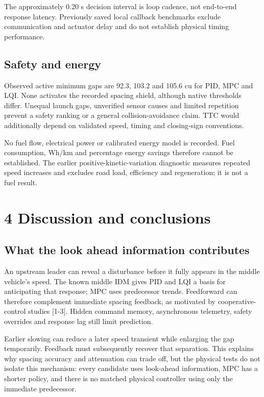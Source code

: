 \documentclass[11pt,a4paper]{article}
\begin{document}
The approximately 0.20 s decision interval is loop cadence, not end-to-end response latency. Previously saved local callback benchmarks exclude communication and actuator delay and do not establish physical timing performance.


\subsection*{Safety and energy}

Observed active minimum gaps are 92.3, 103.2 and 105.6 cu for PID, MPC and LQI. None activates the recorded spacing shield, although native thresholds differ. Unequal launch gaps, unverified sensor causes and limited repetition prevent a safety ranking or a general collision-avoidance claim. TTC would additionally depend on validated speed, timing and closing-sign conventions.


No fuel flow, electrical power or calibrated energy model is recorded. Fuel consumption, Wh/km and percentage energy savings therefore cannot be established. The earlier positive-kinetic-variation diagnostic measures repeated speed increases and excludes road load, efficiency and regeneration; it is not a fuel result.


\newpage

\section*{4 Discussion and conclusions}

\subsection*{What the look ahead information contributes}

An upstream leader can reveal a disturbance before it fully appears in the middle vehicle's speed. The known middle IDM gives PID and LQI a basis for anticipating that response; MPC uses predecessor trends. Feedforward can therefore complement immediate spacing feedback, as motivated by cooperative-control studies [1-3]. Hidden command memory, asynchronous telemetry, safety overrides and response lag still limit prediction.


Earlier slowing can reduce a later speed transient while enlarging the gap temporarily. Feedback must subsequently recover that separation. This explains why spacing accuracy and attenuation can trade off, but the physical tests do not isolate this mechanism: every candidate uses look-ahead information, MPC has a shorter policy, and there is no matched physical controller using only the immediate predecessor.
\end{document}
